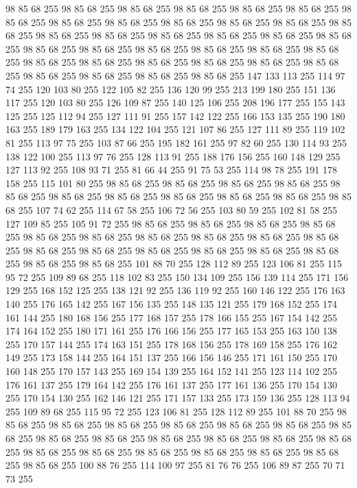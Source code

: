 98 85 68 255 98 85 68 255 98 85 68 255 98 85 68 255 98 85 68 255 98 85 68 255 98 85 68 255 98 85 68 255 98 85 68 255 98 85 68 255 98 85 68 255 98 85 68 255 98 85 68 255 98 85 68 255 98 85 68 255 98 85 68 255 98 85 68 255 98 85 68 255 98 85 68 255 98 85 68 255 98 85 68 255 98 85 68 255 98 85 68 255 98 85 68 255 98 85 68 255 98 85 68 255 98 85 68 255 98 85 68 255 98 85 68 255 98 85 68 255 98 85 68 255 98 85 68 255 98 85 68 255 98 85 68 255 98 85 68 255 147 133 113 255 114 97 74 255 120 103 80 255 122 105 82 255 136 120 99 255 213 199 180 255 151 136 117 255 120 103 80 255 126 109 87 255 140 125 106 255 208 196 177 255 155 143 125 255 125 112 94 255 127 111 91 255 157 142 122 255 166 153 135 255 190 180 163 255 189 179 163 255 134 122 104 255 121 107 86 255 127 111 89 255 119 102 81 255 113 97 75 255 103 87 66 255 195 182 161 255 97 82 60 255 130 114 93 255 138 122 100 255 113 97 76 255
128 113 91 255 188 176 156 255 160 148 129 255 127 113 92 255 108 93 71 255 81 66 44 255 91 75 53 255 114 98 78 255 191 178 158 255 115 101 80 255 98 85 68 255 98 85 68 255 98 85 68 255 98 85 68 255 98 85 68 255 98 85 68 255 98 85 68 255 98 85 68 255 98 85 68 255 98 85 68 255 98 85 68 255 107 74 62 255 114 67 58 255 106 72 56 255 103 80 59 255 102 81 58 255 127 109 85 255 105 91 72 255 98 85 68 255 98 85 68 255 98 85 68 255 98 85 68 255 98 85 68 255 98 85 68 255 98 85 68 255 98 85 68 255 98 85 68 255 98 85 68 255 98 85 68 255 98 85 68 255 98 85 68 255 98 85 68 255 98 85 68 255 98 85 68 255 98 85 68 255 98 85 68 255 101 88 70 255 128 112 89 255 123 106 81 255 115 95 72 255 109 89 68 255 118 102 83 255 150 134 109 255 156 139 114 255 171 156 129 255 168 152 125 255 138 121 92 255 136 119 92 255 160 146 122 255 176 163 140 255 176 165 142 255 167 156 135 255 148 135 121 255 179 168 152 255
174 161 144 255 180 168 156 255 177 168 157 255 178 166 155 255 167 154 142 255 174 164 152 255 180 171 161 255 176 166 156 255 177 165 153 255 163 150 138 255 170 157 144 255 174 163 151 255 178 168 156 255 178 169 158 255 176 162 149 255 173 158 144 255 164 151 137 255 166 156 146 255 171 161 150 255 170 160 148 255 170 157 143 255 169 154 139 255 164 152 141 255 123 114 102 255 176 161 137 255 179 164 142 255 176 161 137 255 177 161 136 255 170 154 130 255 170 154 130 255 162 146 121 255 171 157 133 255 173 159 136 255 128 113 94 255 109 89 68 255 115 95 72 255 123 106 81 255 128 112 89 255 101 88 70 255 98 85 68 255 98 85 68 255 98 85 68 255 98 85 68 255 98 85 68 255 98 85 68 255 98 85 68 255 98 85 68 255 98 85 68 255 98 85 68 255 98 85 68 255 98 85 68 255 98 85 68 255 98 85 68 255 98 85 68 255 98 85 68 255 98 85 68 255 98 85 68 255 98 85 68 255 98 85 68 255 100 88 76 255 114 100 97 255 81 76 76 255 106 89 87 255 70 71 73 255
